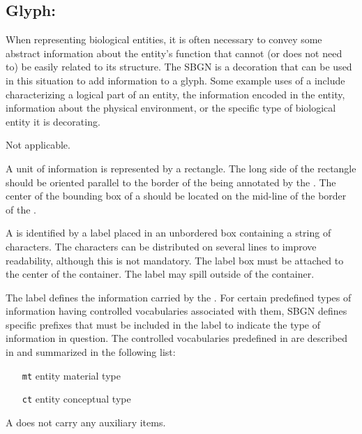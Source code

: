 \color{blue}

\subsection{Glyph: }
\label{sec:unitInfo}

When representing biological entities, it is often necessary to convey some abstract information about the entity's function that cannot (or does not need to) be easily related to its structure.  The SBGN  is a decoration that can be used in this situation to add information to a glyph.  Some example uses of a  include characterizing a logical part of an entity, the information encoded in the entity, information about the physical environment, or the specific type of biological entity it is decorating.

\begin{glyphDescription}

\glyphSboTerm Not applicable.

\glyphContainer A unit of information is represented by a rectangle.  The long side of the rectangle should be oriented parallel to the border of the  being annotated by the . The center of the bounding box of a  should be located on the mid-line of the border of the .

\glyphLabel A  is identified by a label placed in an unbordered box containing a string of characters.  The characters can be distributed on several lines to improve readability, although this is not mandatory.  The label box must be attached to the center of the container.  The label may spill outside of the container.

The label defines the information carried by the .  For certain predefined types of information having controlled vocabularies associated with them, SBGN defines specific prefixes that must be included in the label to indicate the type of information in question.  The controlled vocabularies predefined in \SBGNERLone are described in  and summarized in the following list:

\begin{center}
  \begin{itemize}\setlength{\parskip}{0ex}
  \item[\texttt{mt}] entity material type
  \item[\texttt{ct}] entity conceptual type
  \end{itemize}
\end{center}

\glyphAux A  does not carry any auxiliary items.

\end{glyphDescription}


